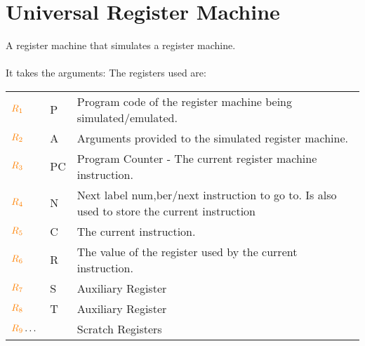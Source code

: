 \documentclass{report}
\begin{document}
    \section*{Universal Register Machine}
        A register machine that simulates a register machine.
        \\
        \\ It takes the arguments:
        The registers used are:
        \begin{center}
            \begin{tabular}{l l p{}}
                $\text{\textcolor{orange}{$R_{1}$}}$ & P & Program code of the register machine being simulated/emulated. \\
                $\text{\textcolor{orange}{$R_{2}$}}$ & A & Arguments provided to the simulated register machine. \\
                $\text{\textcolor{orange}{$R_{3}$}}$ & PC & Program Counter - The current register machine instruction. \\
                $\text{\textcolor{orange}{$R_{4}$}}$ & N & Next label num,ber/next instruction to go to. Is also used to store the current instruction \\
                $\text{\textcolor{orange}{$R_{5}$}}$ & C & The current instruction. \\
                $\text{\textcolor{orange}{$R_{6}$}}$ & R & The value of the register used by the current instruction. \\
                $\text{\textcolor{orange}{$R_{7}$}}$ & S & Auxiliary Register \\
                $\text{\textcolor{orange}{$R_{8}$}}$ & T & Auxiliary Register \\
                $\text{\textcolor{orange}{$R_{9}$}}\dots$ & & Scratch Registers \\
            \end{tabular}
        \end{center}
\end{document}
